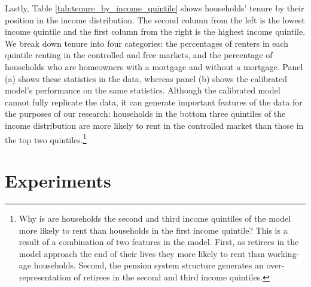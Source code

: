 \documentclass[parskip=full]{article}
\begin{document}
Lastly, Table \ref{tab:tenure_by_income_quintile} shows households' tenure by their position in the income distribution. The second column from the left is the lowest income quintile and the first column from the right is the highest income quintile. We break down tenure into four categories: the percentages of renters in each quintile renting in the controlled and free markets, and the percentage of households who are homeowners with a mortgage and without a mortgage. Panel (a) shows these statistics in the data, whereas panel (b) shows the calibrated model's performance on the same statistics. Although the calibrated model cannot fully replicate the data, it can generate important features of the data for the purposes of our research: households in the bottom three quintiles of the income distribution are more likely to rent in the controlled market than those in the top two quintiles.\footnote{Why is are households the second and third income quintiles of the model more likely to rent than households in the first income quintile? This is a result of a combination of two features in the model. First, as retirees in the model approach the end of their lives they more likely to rent than working-age households. Second, the pension system structure generates an over-representation of retirees in the second and third income quintiles.}

\section{Experiments}\label{section:experiments}
\end{document}
